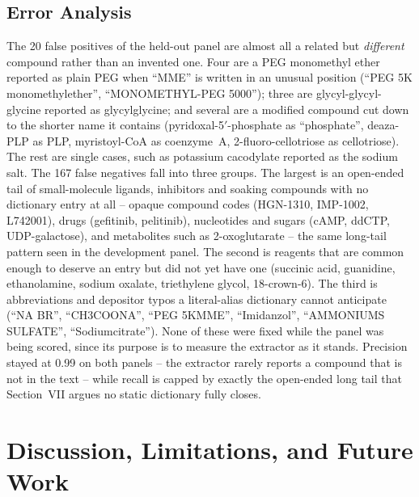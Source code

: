 \subsection{Error Analysis}

The 20 false positives of the held-out panel are almost all a related
but \emph{different} compound rather than an invented one. Four are a
PEG monomethyl ether reported as plain PEG when ``MME'' is written in an
unusual position (``PEG 5K monomethylether'', ``MONOMETHYL-PEG 5000'');
three are glycyl-glycyl-glycine reported as glycylglycine; and several
are a modified compound cut down to the shorter name it contains
(pyridoxal-5$'$-phosphate as ``phosphate'', deaza-PLP as PLP,
myristoyl-CoA as coenzyme~A, 2-fluoro-cellotriose as cellotriose). The
rest are single cases, such as potassium cacodylate reported as the
sodium salt. The 167 false negatives fall into three groups. The largest
is an open-ended tail of small-molecule ligands, inhibitors and soaking
compounds with no dictionary entry at all -- opaque compound codes
(HGN-1310, IMP-1002, L742001), drugs (gefitinib, pelitinib), nucleotides
and sugars (cAMP, ddCTP, UDP-galactose), and metabolites such as
2-oxoglutarate -- the same long-tail pattern seen in the development
panel. The second is reagents that are common enough to deserve an
entry but did not yet have one (succinic acid, guanidine, ethanolamine,
sodium oxalate, triethylene glycol, 18-crown-6). The third is
abbreviations and depositor typos a literal-alias dictionary cannot
anticipate (``NA BR'', ``CH3COONA'', ``PEG 5KMME'', ``Imidanzol'',
``AMMONIUMS SULFATE'', ``Sodiumcitrate''). None of these were fixed while
the panel was being scored, since its purpose is to measure the
extractor as it stands. Precision stayed at 0.99 on both panels --
the extractor rarely reports a compound that is not in the text --
while recall is capped by exactly the open-ended long tail that
Section~VII argues no static dictionary fully closes.

\section{Discussion, Limitations, and Future Work}

